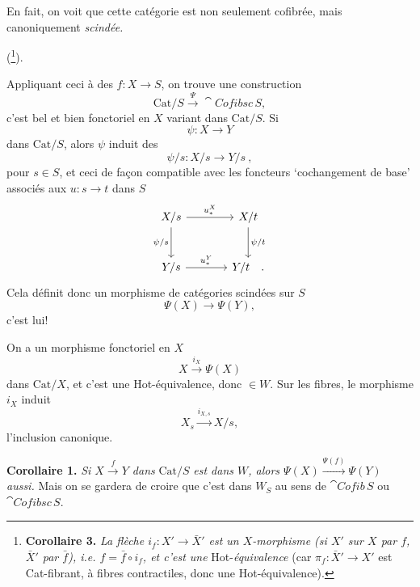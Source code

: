 En fait, on voit que cette catégorie est non seulement cofibrée, mais canoniquement \textit{scindée.}

(\footnote[10]{\textbf{Corollaire 3.} \textit{La flèche $i_f : X' \longrightarrow \bar{X}'$ est un $X$-morphisme (si $X'$ sur $X$ par $f$, $\bar{X}'$ par $\bar{f}$), i.e. $f = \bar{f}\circ i_f$, et c'est une} Hot-\textit{équivalence} (car $\pi_f : \bar{X}' \longrightarrow X'$ est Cat-fibrant, à fibres contractiles, donc une Hot-équivalence).}).

Appliquant ceci à des $f : X \longrightarrow S$, on trouve une construction
\[
\mathrm{Cat}/S \xrightarrow{\Psi} \cat{Cofibsc}\,S,
\]
c'est bel et bien fonctoriel en $X$ variant dans $\mathrm{Cat}/S$. Si
\[
\psi : X \longrightarrow Y
\]
dans $\mathrm{Cat}/S$, alors $\psi$ induit des
\[
\psi/s : X/s \longrightarrow Y/s\ ,
\]
pour $s \in S$, et ceci de façon compatible avec les
foncteurs `cochangement de base' associés aux $u : s \longrightarrow t$ dans $S$
\[
\begin{tikzcd}[column sep=large, row sep=large]
X/s \arrow[r, "u_*^X"] \arrow[d, "\psi/s"'] & X/t \arrow[d, "\psi/t"] \\
Y/s \arrow[r, "u_*^Y"] & Y/t \quad .
\end{tikzcd}
\]
Cela définit donc un morphisme de catégories scindées sur $S$
\[
\Psi(X) \longrightarrow \Psi(Y),
\]
c'est lui!

On a un morphisme fonctoriel en $X$
\[
X \xrightarrow{i_X} \Psi(X)
\]
dans $\mathrm{Cat}/X$, et c'est une Hot-équivalence, donc $\in W$. Sur les fibres, le morphisme $i_X$ induit
\[
X_s \xrightarrow{i_{X,s}} X/s,
\]
l'inclusion canonique.

\textbf{Corollaire 1.} \textit{Si $X \xrightarrow{f} Y$ dans} $\mathrm{Cat}/S$ \textit{est dans $W$, alors $\Psi(X) \xrightarrow{\Psi(f)} \Psi(Y)$ aussi.} Mais on se gardera de croire que c'est dans $W_S$ au sens de $\cat{Cofib}\,S$ ou $\cat{Cofibsc}\,S$.

